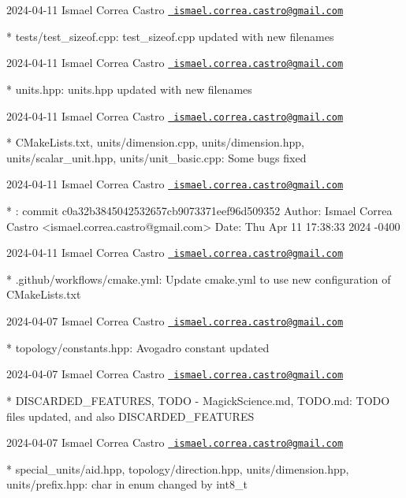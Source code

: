  2024-\/04-\/11 Ismael Correa Castro \href{mailto:ismael.correa.castro@gmail.com}{\texttt{ ismael.\+correa.\+castro@gmail.\+com}} \begin{DoxyVerb}* tests/test_sizeof.cpp: test_sizeof.cpp updated with new filenames
\end{DoxyVerb}
 2024-\/04-\/11 Ismael Correa Castro \href{mailto:ismael.correa.castro@gmail.com}{\texttt{ ismael.\+correa.\+castro@gmail.\+com}} \begin{DoxyVerb}* units.hpp: units.hpp updated with new filenames
\end{DoxyVerb}
 2024-\/04-\/11 Ismael Correa Castro \href{mailto:ismael.correa.castro@gmail.com}{\texttt{ ismael.\+correa.\+castro@gmail.\+com}} \begin{DoxyVerb}* CMakeLists.txt, units/dimension.cpp, units/dimension.hpp,
units/scalar_unit.hpp, units/unit_basic.cpp: Some bugs fixed
\end{DoxyVerb}
 2024-\/04-\/11 Ismael Correa Castro \href{mailto:ismael.correa.castro@gmail.com}{\texttt{ ismael.\+correa.\+castro@gmail.\+com}} \begin{DoxyVerb}* : commit c0a32b3845042532657cb9073371eef96d509352 Author: Ismael
Correa Castro <ismael.correa.castro@gmail.com> Date:   Thu Apr 11
17:38:33 2024 -0400
\end{DoxyVerb}
 2024-\/04-\/11 Ismael Correa Castro \href{mailto:ismael.correa.castro@gmail.com}{\texttt{ ismael.\+correa.\+castro@gmail.\+com}} \begin{DoxyVerb}* .github/workflows/cmake.yml: Update cmake.yml to use new
configuration of CMakeLists.txt
\end{DoxyVerb}
 2024-\/04-\/07 Ismael Correa Castro \href{mailto:ismael.correa.castro@gmail.com}{\texttt{ ismael.\+correa.\+castro@gmail.\+com}} \begin{DoxyVerb}* topology/constants.hpp: Avogadro constant updated
\end{DoxyVerb}
 2024-\/04-\/07 Ismael Correa Castro \href{mailto:ismael.correa.castro@gmail.com}{\texttt{ ismael.\+correa.\+castro@gmail.\+com}} \begin{DoxyVerb}* DISCARDED_FEATURES, TODO - MagickScience.md, TODO.md: TODO files
updated, and also DISCARDED_FEATURES
\end{DoxyVerb}
 2024-\/04-\/07 Ismael Correa Castro \href{mailto:ismael.correa.castro@gmail.com}{\texttt{ ismael.\+correa.\+castro@gmail.\+com}} \begin{DoxyVerb}* special_units/aid.hpp, topology/direction.hpp,
units/dimension.hpp, units/prefix.hpp: char in enum changed by
int8_t
\end{DoxyVerb}
